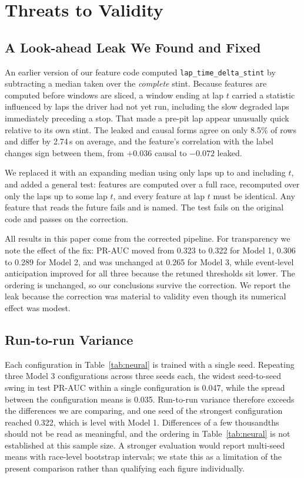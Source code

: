 \documentclass[conference]{IEEEtran}
\begin{document}
\section{Threats to Validity}
\label{sec:validity}

\subsection{A Look-ahead Leak We Found and Fixed}

An earlier version of our feature code computed \texttt{lap\_time\_delta\_stint} by subtracting a median taken over the \emph{complete} stint. Because features are computed before windows are sliced, a window ending at lap $t$ carried a statistic influenced by laps the driver had not yet run, including the slow degraded laps immediately preceding a stop. That made a pre-pit lap appear unusually quick relative to its own stint. The leaked and causal forms agree on only 8.5\% of rows and differ by 2.74\,s on average, and the feature's correlation with the label changes sign between them, from $+0.036$ causal to $-0.072$ leaked.

We replaced it with an expanding median using only laps up to and including $t$, and added a general test: features are computed over a full race, recomputed over only the laps up to some lap $t$, and every feature at lap $t$ must be identical. Any feature that reads the future fails and is named. The test fails on the original code and passes on the correction.

All results in this paper come from the corrected pipeline. For transparency we note the effect of the fix: PR-AUC moved from 0.323 to 0.322 for Model 1, 0.306 to 0.289 for Model 2, and was unchanged at 0.265 for Model 3, while event-level anticipation improved for all three because the retuned thresholds sit lower. The ordering is unchanged, so our conclusions survive the correction. We report the leak because the correction was material to validity even though its numerical effect was modest.

\subsection{Run-to-run Variance}

Each configuration in Table~\ref{tab:neural} is trained with a single seed. Repeating three Model 3 configurations across three seeds each, the widest seed-to-seed swing in test PR-AUC within a single configuration is 0.047, while the spread between the configuration means is 0.035. Run-to-run variance therefore exceeds the differences we are comparing, and one seed of the strongest configuration reached 0.322, which is level with Model 1. Differences of a few thousandths should not be read as meaningful, and the ordering in Table~\ref{tab:neural} is not established at this sample size. A stronger evaluation would report multi-seed means with race-level bootstrap intervals; we state this as a limitation of the present comparison rather than qualifying each figure individually.
\end{document}
